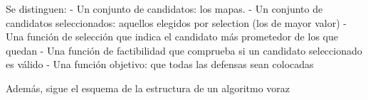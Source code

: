 Se distinguen:
- Un conjunto de candidatos: los mapas.
- Un conjunto de candidatos seleccionados: aquellos elegidos por selection (los de mayor valor)
- Una función de selección que indica el candidato más prometedor de los que quedan
- Una función de factibilidad que comprueba si un candidato seleccionado es válido
- Una función objetivo: que todas las defensas sean colocadas

Además, sigue el esquema de la estructura de un algoritmo voraz
